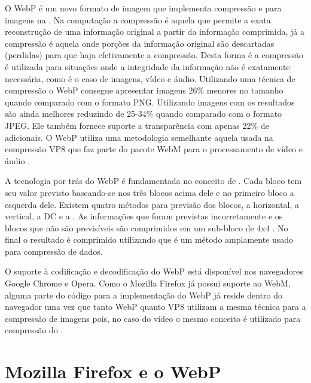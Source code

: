 \documentclass[espaco=simples,appendix=Name]{abnt}
\begin{document}
O WebP é um novo formato de imagem que implementa compressão  e  para imagens na . Na computação a compressão  é aquela que permite a exata reconstrução de uma informação original a partir da informação comprimida, já a compressão  é aquela onde porções da informação original são descartadas (perdidas) para que haja efetivamente a compressão. Desta forma é a compressão  é utilizada para situações onde a integridade da informação não é exatamente necessária, como é o caso de imagens, vídeo e áudio. Utilizando uma técnica de compressão  o WebP consegue apresentar imagens 26\% menores no tamanho quando comparado com o formato PNG. Utilizando imagens com  os resultados são ainda melhores reduzindo de 25-34\% quando comparado com o formato JPEG. Ele também fornece suporte a transparência com apenas 22\% de  adicionais. O WebP utiliza uma metodologia semelhante aquela usada na compressão VP8 que faz parte do pacote WebM para o processamento de vídeo e áudio \cite{WebPLossyStudy}.

A tecnologia por trás do WebP é fundamentada no conceito de . Cada bloco tem seu valor previsto baseando-se nos três blocos acima dele e no primeiro bloco a esquerda dele. Existem quatro métodos para previsão dos blocos, a horizontal, a vertical, a DC e a . As informações que foram previstas incorretamente e os blocos que não são previsíveis são comprimidos em um sub-bloco de 4x4 . No final o resultado é comprimido utilizando  que é um método  amplamente usado para compressão de dados.

O suporte à codificação e decodificação do WebP está disponível nos navegadores Google Chrome e Opera. Como o Mozilla Firefox já possui suporte ao WebM, alguma parte do código para a implementação do WebP já reside dentro do navegador uma vez que tanto WebP quanto VP8 utilizam a mesma técnica para a compressão de imagens pois, no caso do vídeo o mesmo conceito é utilizado para compressão do .

\section{Mozilla Firefox e o WebP}
\end{document}
